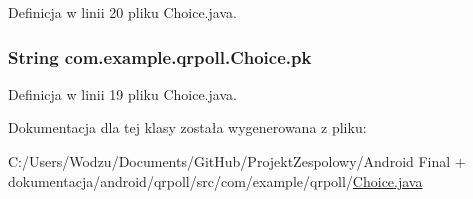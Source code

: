 Definicja w linii 20 pliku Choice.\+java.

\hypertarget{classcom_1_1example_1_1qrpoll_1_1_choice_a6213ee79d3a08c00ca588b9813b7e912}{
\subsubsection[{pk}]{\setlength{\rightskip}{0pt plus 5cm}String com.\+example.\+qrpoll.\+Choice.\+pk\hspace{0.3cm}{\ttfamily [private]}}}\label{classcom_1_1example_1_1qrpoll_1_1_choice_a6213ee79d3a08c00ca588b9813b7e912}


Definicja w linii 19 pliku Choice.\+java.



Dokumentacja dla tej klasy została wygenerowana z pliku\+:\begin{DoxyCompactItemize}
\item 
C\+:/\+Users/\+Wodzu/\+Documents/\+Git\+Hub/\+Projekt\+Zespolowy/\+Android Final + dokumentacja/android/qrpoll/src/com/example/qrpoll/\hyperlink{_choice_8java}{Choice.\+java}\end{DoxyCompactItemize}
